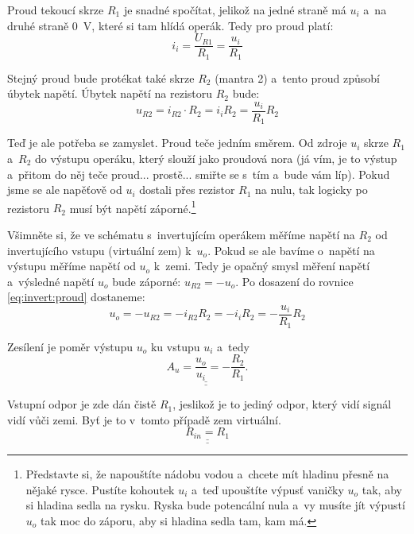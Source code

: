 \documentclass[a4paper,12pt]{article}   %
\begin{document}
Proud tekoucí skrze $R_1$ je snadné spočítat, jelikož na jedné straně má $u_i$ a~na druhé straně 0~V, které si tam hlídá operák. Tedy pro proud platí:
\begin{equation*}
    i_i = \frac{U_{R1}}{R_1} = \frac{u_i}{R_1}
\end{equation*}

Stejný proud bude protékat také skrze $R_2$ (mantra 2) a~tento proud způsobí úbytek napětí. Úbytek napětí na rezistoru $R_2$ bude:
\begin{equation}
    u_{R2} = i_{R2}\cdot R_2 = i_i R_2 = \frac{u_i}{R_1} R_2
    \label{eq:invert:proud}
\end{equation}

Teď je ale potřeba se zamyslet. Proud teče jedním směrem. Od zdroje $u_i$ skrze $R_1$ a~$R_2$ do výstupu operáku, který slouží jako proudová nora (já vím, je to výstup a~přitom do něj teče proud... prostě... smiřte se s~tím a~bude vám líp). Pokud jsme se ale napěťově od $u_i$ dostali přes rezistor $R_1$ na nulu, tak logicky po rezistoru $R_2$ musí být napětí záporné.\footnote{Představte si, že napouštíte nádobu vodou a~chcete mít hladinu přesně na nějaké rysce. Pustíte kohoutek $u_i$ a~teď upouštíte výpusť vaničky $u_o$ tak, aby si hladina sedla na rysku. Ryska bude potencální nula a~vy musíte jít výpustí $u_o$ tak moc do záporu, aby si hladina sedla tam, kam má.}

Všimněte si, že ve schématu s~invertujícím operákem měříme napětí na $R_2$ od invertujícího vstupu (virtuální zem) k~$u_o$. Pokud se ale bavíme o~napětí na výstupu měříme napětí od $u_o$ k~zemi. Tedy je opačný smysl měření napětí a~výsledné napětí $u_o$ bude záporné: $u_{R2} = -u_o$. Po dosazení do rovnice \eqref{eq:invert:proud} dostaneme:
\begin{equation*}
    u_o = -u_{R2} = -i_{R2}R_2 = -i_i R_2 = -\frac{u_i}{R_1}R_2
\end{equation*}

Zesílení je poměr výstupu $u_o$ ku vstupu $u_i$ a~tedy
\begin{equation*}
    \underline{\underline{A_u = \frac{u_o}{u_i} = -\frac{R_2}{R_1}}}.
\end{equation*}



Vstupní odpor je zde dán čistě $R_1$, jeslikož je to jediný odpor, který vidí signál vidí vůči zemi. Byť je to v~tomto případě zem virtuální.
\begin{equation*}
    \underline{\underline{R_{in} = R_1}}
\end{equation*}
\end{document}
